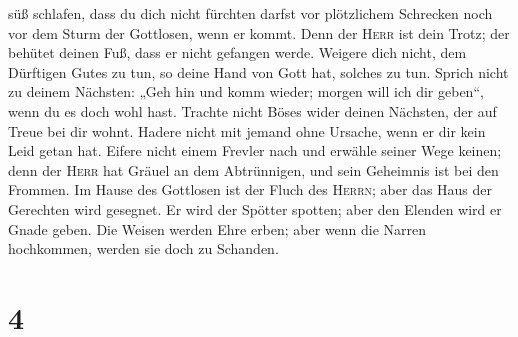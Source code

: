 süß schlafen,  dass du dich nicht fürchten darfst vor
plötzlichem Schrecken noch vor dem Sturm der Gottlosen, wenn er kommt.
 Denn der \textsc{Herr} ist dein Trotz; der behütet
deinen Fuß, dass er nicht gefangen werde.  Weigere dich
nicht, dem Dürftigen Gutes zu tun, so deine Hand von Gott hat, solches
zu tun.  Sprich nicht zu deinem Nächsten: „Geh hin und
komm wieder; morgen will ich dir geben``, wenn du es doch wohl hast.
 Trachte nicht Böses wider deinen Nächsten, der auf Treue
bei dir wohnt.  Hadere nicht mit jemand ohne Ursache,
wenn er dir kein Leid getan hat.  Eifere nicht einem
Frevler nach und erwähle seiner Wege keinen;  denn der
\textsc{Herr} hat Gräuel an dem Abtrünnigen, und sein Geheimnis ist bei
den Frommen.  Im Hause des Gottlosen ist der Fluch des
\textsc{Herrn}; aber das Haus der Gerechten wird gesegnet.
 Er wird der Spötter spotten; aber den Elenden wird er
Gnade geben.  Die Weisen werden Ehre erben; aber wenn die
Narren hochkommen, werden sie doch zu Schanden.

\hypertarget{section-3}{%
\section{4}\label{section-3}}

